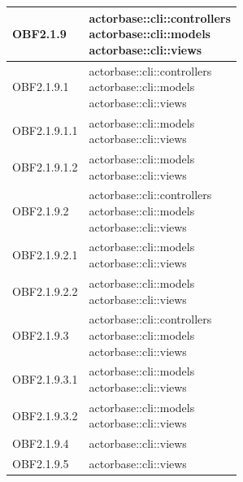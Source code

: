 \documentclass{scalatekids-article}
\begin{document}
\begin{longtable}[H]{|p{3.5cm}|p{7.5cm}|}
OBF2.1.9 & \multiLineCell[t]{actorbase::cli::controllers\\actorbase::cli::models\\actorbase::cli::views\\}\\
\hline
OBF2.1.9.1 & \multiLineCell[t]{actorbase::cli::controllers\\actorbase::cli::models\\actorbase::cli::views\\}\\
\hline
OBF2.1.9.1.1 & \multiLineCell[t]{actorbase::cli::models\\actorbase::cli::views\\}\\
\hline
OBF2.1.9.1.2 & \multiLineCell[t]{actorbase::cli::models\\actorbase::cli::views\\}\\
\hline
OBF2.1.9.2 & \multiLineCell[t]{actorbase::cli::controllers\\actorbase::cli::models\\actorbase::cli::views\\}\\
\hline
OBF2.1.9.2.1 & \multiLineCell[t]{actorbase::cli::models\\actorbase::cli::views\\}\\
\hline
OBF2.1.9.2.2 & \multiLineCell[t]{actorbase::cli::models\\actorbase::cli::views\\}\\
\hline
OBF2.1.9.3 & \multiLineCell[t]{actorbase::cli::controllers\\actorbase::cli::models\\actorbase::cli::views\\}\\
\hline
OBF2.1.9.3.1 & \multiLineCell[t]{actorbase::cli::models\\actorbase::cli::views\\}\\
\hline
OBF2.1.9.3.2 & \multiLineCell[t]{actorbase::cli::models\\actorbase::cli::views\\}\\
\hline
OBF2.1.9.4 & \multiLineCell[t]{actorbase::cli::views\\}\\
\hline
OBF2.1.9.5 & \multiLineCell[t]{actorbase::cli::views\\}\\

\end{longtable}
\end{document}
